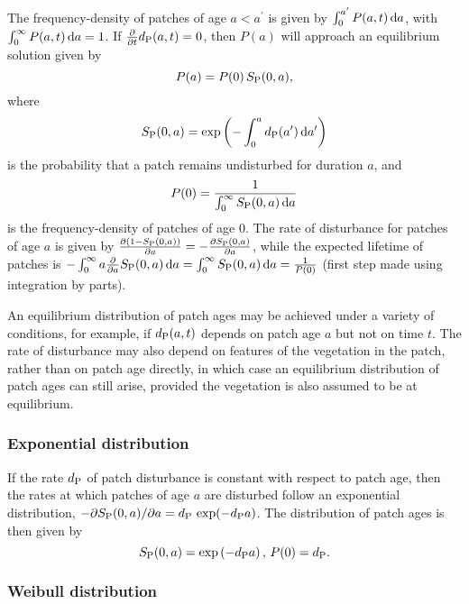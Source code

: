 \documentclass[10pt,twoside]{article}
\begin{document}
The frequency-density of patches of age \(a < a^{\prime}\) is given by
\(\int_{0}^{a^{\prime}}P(a, t) \, {\rm d}a\), with
\(\int_{0}^{\infty} P(a, t) \, {\rm d}a = 1\). If
\(\frac{\partial}{\partial t}d_{\rm P}(a, t) = 0\), then \(P(a)\) will
approach an equilibrium solution given by \[P(a) = P(0) \, S_{\rm P}(0, a),\] where
\[S_{\rm P}(0, a) = \exp \left( - \int_{0}^{a} d_{\rm P}(a^\prime) \, {\rm d}a^\prime\right)\]
is the probability that a patch remains undisturbed for
duration \(a\), and
\[P(0) = \frac1{ \int_{0}^{\infty}S_{\rm P}(0, a) \, {\rm d}a}\] is the
frequency-density of patches of age \(0\). The rate of disturbance for patches
of age \(a\) is given by
\(\frac{\partial (1-S_{\rm P}(0, a))}{\partial a} = - \frac{\partial S_{\rm P}(0, a)}{\partial a}\),
while the expected lifetime of patches is
\(- \int_0^\infty a \frac{\partial}{\partial a} S_{\rm P}(0, a) \, {\rm d} a = \int_0^\infty S_{\rm P}(0, a) \, {\rm d} a = \frac1{P(0)}\)
(first step made using integration by parts).

An equilibrium distribution of patch ages may be achieved under a variety of
conditions, for example, if \(d_{\rm P}(a, t)\) depends on patch age \(a\) but
not on time \(t\). The rate of disturbance
may also depend on features of the vegetation in the patch, rather than on patch age directly, in which case an equilibrium distribution of patch ages can still arise, provided the
vegetation is also assumed to be at equilibrium.

\subsubsection{Exponential distribution}\label{exponential-distribution}

If the rate \(d_{\rm P}\) of patch disturbance is constant with respect to
patch age, then the rates at which patches of age \(a\) are
disturbed follow an exponential distribution,
\(-\partial S_{\rm P}(0, a)/ \partial a = d_{\rm P} \, \exp(-d_{\rm P} a)\). The
distribution of patch ages is then given by
\[ S_{\rm P}(0, a) = \exp\left(-d_{\rm P} a\right), \, P(0) = d_{\rm P}.\]

\subsubsection{Weibull distribution}\label{weibull-distribution}
\end{document}
